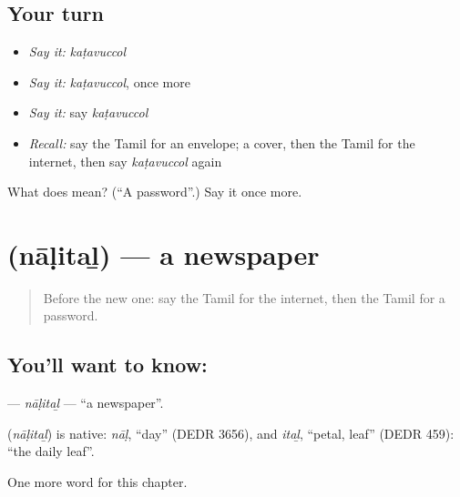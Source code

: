 \subsection*{Your turn}
\begin{itemize}
\raggedright
  \item \emph{Say it:} \emph{kaṭavuccol}
  \item \emph{Say it:} \emph{kaṭavuccol}, once more
  \item \emph{Say it:} say \emph{kaṭavuccol}
  \item \emph{Recall:} say the Tamil for an envelope; a cover, then the Tamil for the internet, then say \emph{kaṭavuccol} again
\end{itemize}

\begin{tcolorbox}[breakable,colback=teal!4,colframe=teal!35!black,title={Before you move on}]
What does  mean? (\textquotedblleft{}A password\textquotedblright{}.) Say it once more.
\end{tcolorbox}
\section[\texorpdfstring{\ta{நாளிதழ்} (nāḷitaḻ)}{நாளிதழ் (nāḷitaḻ)}]{ (nāḷitaḻ) — a newspaper}

\label{lesson:TA-C216-nalital}



\begin{quote}
Before the new one: say the Tamil for the internet, then the Tamil for a password.
\end{quote}

\subsection*{You'll want to know: }
\textbf{} — \emph{nāḷitaḻ} — \textquotedblleft{}a newspaper\textquotedblright{}.

\begin{cousinweb}
\textbf{} (\emph{nāḷitaḻ}) is native: \emph{nāḷ}, \textquotedblleft{}day\textquotedblright{} (DEDR 3656), and \emph{itaḻ}, \textquotedblleft{}petal, leaf\textquotedblright{} (DEDR 459): \textquotedblleft{}the daily leaf\textquotedblright{}.
\end{cousinweb}

\begin{grammarlens}[title={What you've built}]
One more word for this chapter.
\end{grammarlens}

